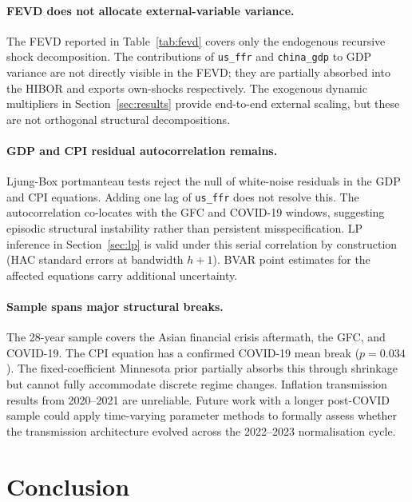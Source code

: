 \documentclass[12pt,a4paper]{article}
\begin{document}
\paragraph{FEVD does not allocate external-variable variance.}
The FEVD reported in Table~\ref{tab:fevd} covers only the endogenous recursive
shock decomposition. The contributions of \texttt{us\_ffr} and \texttt{china\_gdp}
to GDP variance are not directly visible in the FEVD; they are partially absorbed
into the HIBOR and exports own-shocks respectively. The exogenous dynamic
multipliers in Section~\ref{sec:results} provide end-to-end external scaling, but
these are not orthogonal structural decompositions.

\paragraph{GDP and CPI residual autocorrelation remains.}
Ljung-Box portmanteau tests reject the null of white-noise residuals in the GDP
and CPI equations. Adding one lag of \texttt{us\_ffr} does not resolve this.
The autocorrelation co-locates with the GFC and COVID-19 windows, suggesting
episodic structural instability rather than persistent misspecification. LP
inference in Section~\ref{sec:lp} is valid under this serial correlation by
construction (HAC standard errors at bandwidth $h + 1$). BVAR point estimates
for the affected equations carry additional uncertainty.

\paragraph{Sample spans major structural breaks.}
The 28-year sample covers the Asian financial crisis aftermath, the GFC, and
COVID-19. The CPI equation has a confirmed COVID-19 mean break ($p = 0.034$).
The fixed-coefficient Minnesota prior partially absorbs this through shrinkage
but cannot fully accommodate discrete regime changes. Inflation transmission
results from 2020--2021 are unreliable. Future work with a longer post-COVID
sample could apply time-varying parameter methods to formally assess whether
the transmission architecture evolved across the 2022--2023 normalisation cycle.

\section{Conclusion}
\label{sec:conclusion}
\end{document}
